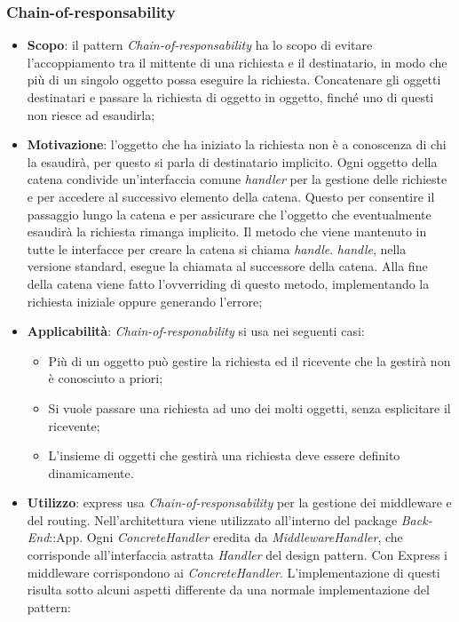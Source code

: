 \subsubsection{Chain-of-responsability}
\begin{itemize}
\item \textbf{Scopo}: il pattern \textit{Chain-of-responsability} ha lo scopo di evitare l'accoppiamento tra il mittente di una richiesta e il destinatario, in modo che più di un singolo oggetto possa eseguire la richiesta. Concatenare gli oggetti destinatari e passare la richiesta di oggetto in oggetto, finché uno di questi non riesce ad esaudirla;
\item \textbf{Motivazione}: l'oggetto che ha iniziato la richiesta non è a conoscenza di chi la esaudirà, per questo si parla di destinatario implicito. Ogni oggetto della catena condivide un'interfaccia comune \textit{handler} per la gestione delle richieste e per accedere al successivo elemento della catena. Questo per consentire il passaggio lungo la catena e per assicurare che l'oggetto che eventualmente esaudirà la richiesta rimanga implicito. Il metodo che viene mantenuto in tutte le interfacce per creare la catena si chiama \textit{handle}. \textit{handle}, nella versione standard, esegue la chiamata al successore della catena. Alla fine della catena viene fatto l'ovverriding di questo metodo, implementando la richiesta iniziale oppure generando l'errore;
\item \textbf{Applicabilità}: \textit{Chain-of-responability} si usa nei seguenti casi:
	\begin{itemize}
		\item Più di un oggetto può gestire la richiesta ed il ricevente che la gestirà non è conosciuto a priori;
		\item Si vuole passare una richiesta ad uno dei molti oggetti, senza esplicitare il ricevente;
		\item L'insieme di oggetti che gestirà una richiesta deve essere definito dinamicamente.
	\end{itemize}
\item \textbf{Utilizzo}: express usa \textit{Chain-of-responsability} per la gestione dei middleware e del routing. Nell'architettura viene utilizzato all'interno del package \textit{Back-End}::App. Ogni \textit{ConcreteHandler} eredita da \textit{MiddlewareHandler}, che corrisponde all'interfaccia astratta \textit{Handler} del design pattern. Con Express i middleware corrispondono ai \textit{ConcreteHandler}. L'implementazione di questi risulta sotto alcuni aspetti differente da una normale implementazione del pattern:

\end{itemize}
